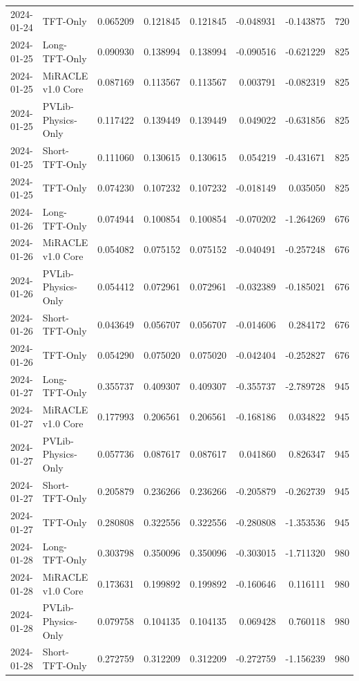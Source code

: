 \begin{tabular}{llrrrrrr}
2024-01-24 & TFT-Only & 0.065209 & 0.121845 & 0.121845 & -0.048931 & -0.143875 & 720 \\
2024-01-25 & Long-TFT-Only & 0.090930 & 0.138994 & 0.138994 & -0.090516 & -0.621229 & 825 \\
2024-01-25 & MiRACLE v1.0 Core & 0.087169 & 0.113567 & 0.113567 & 0.003791 & -0.082319 & 825 \\
2024-01-25 & PVLib-Physics-Only & 0.117422 & 0.139449 & 0.139449 & 0.049022 & -0.631856 & 825 \\
2024-01-25 & Short-TFT-Only & 0.111060 & 0.130615 & 0.130615 & 0.054219 & -0.431671 & 825 \\
2024-01-25 & TFT-Only & 0.074230 & 0.107232 & 0.107232 & -0.018149 & 0.035050 & 825 \\
2024-01-26 & Long-TFT-Only & 0.074944 & 0.100854 & 0.100854 & -0.070202 & -1.264269 & 676 \\
2024-01-26 & MiRACLE v1.0 Core & 0.054082 & 0.075152 & 0.075152 & -0.040491 & -0.257248 & 676 \\
2024-01-26 & PVLib-Physics-Only & 0.054412 & 0.072961 & 0.072961 & -0.032389 & -0.185021 & 676 \\
2024-01-26 & Short-TFT-Only & 0.043649 & 0.056707 & 0.056707 & -0.014606 & 0.284172 & 676 \\
2024-01-26 & TFT-Only & 0.054290 & 0.075020 & 0.075020 & -0.042404 & -0.252827 & 676 \\
2024-01-27 & Long-TFT-Only & 0.355737 & 0.409307 & 0.409307 & -0.355737 & -2.789728 & 945 \\
2024-01-27 & MiRACLE v1.0 Core & 0.177993 & 0.206561 & 0.206561 & -0.168186 & 0.034822 & 945 \\
2024-01-27 & PVLib-Physics-Only & 0.057736 & 0.087617 & 0.087617 & 0.041860 & 0.826347 & 945 \\
2024-01-27 & Short-TFT-Only & 0.205879 & 0.236266 & 0.236266 & -0.205879 & -0.262739 & 945 \\
2024-01-27 & TFT-Only & 0.280808 & 0.322556 & 0.322556 & -0.280808 & -1.353536 & 945 \\
2024-01-28 & Long-TFT-Only & 0.303798 & 0.350096 & 0.350096 & -0.303015 & -1.711320 & 980 \\
2024-01-28 & MiRACLE v1.0 Core & 0.173631 & 0.199892 & 0.199892 & -0.160646 & 0.116111 & 980 \\
2024-01-28 & PVLib-Physics-Only & 0.079758 & 0.104135 & 0.104135 & 0.069428 & 0.760118 & 980 \\
2024-01-28 & Short-TFT-Only & 0.272759 & 0.312209 & 0.312209 & -0.272759 & -1.156239 & 980 \\

\end{tabular}
